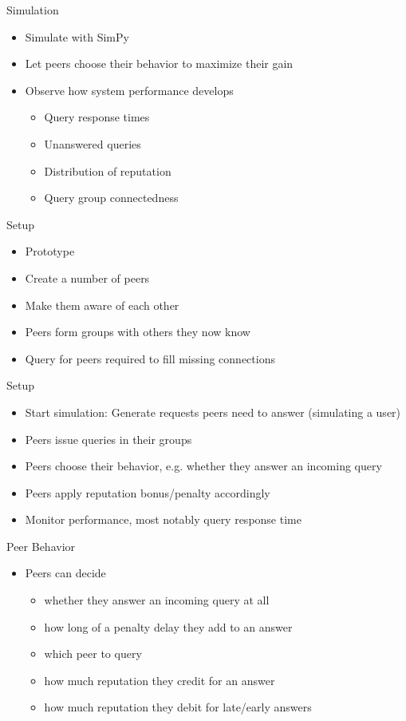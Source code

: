 \documentclass[presentation,english,usenames,dvipsnames]{beamer}
\begin{document}
\begin{frame}{Simulation}
  \begin{itemize}
    \item Simulate with SimPy
    \item Let peers choose their behavior to maximize their gain
    \item Observe how system performance develops
    \begin{itemize}
      \item Query response times
      \item Unanswered queries
      \item Distribution of reputation
      \item Query group connectedness
    \end{itemize}
  \end{itemize}
\end{frame}

\begin{frame}{Setup}
  \begin{itemize}
    \item Prototype
    \item Create a number of peers
    \item Make them aware of each other
    \item Peers form groups with others they now know
    \item Query for peers required to fill missing connections
  \end{itemize}
\end{frame}

\begin{frame}{Setup}
  \begin{itemize}
    \item Start simulation: Generate requests peers need to answer (simulating a
          user)
    \item Peers issue queries in their groups
    \item Peers choose their behavior, e.g. whether they answer an incoming
          query
    \item Peers apply reputation bonus/penalty accordingly
    \item Monitor performance, most notably query response time
  \end{itemize}
\end{frame}

\begin{frame}{Peer Behavior}
  \begin{itemize}
    \item Peers can decide
    \begin{itemize}
      \item whether they answer an incoming query at all
      \item how long of a penalty delay they add to an answer
      \item which peer to query
      \item how much reputation they credit for an answer
      \item how much reputation they debit for late/early answers
    \end{itemize}
  \end{itemize}
\end{frame}
\end{document}
